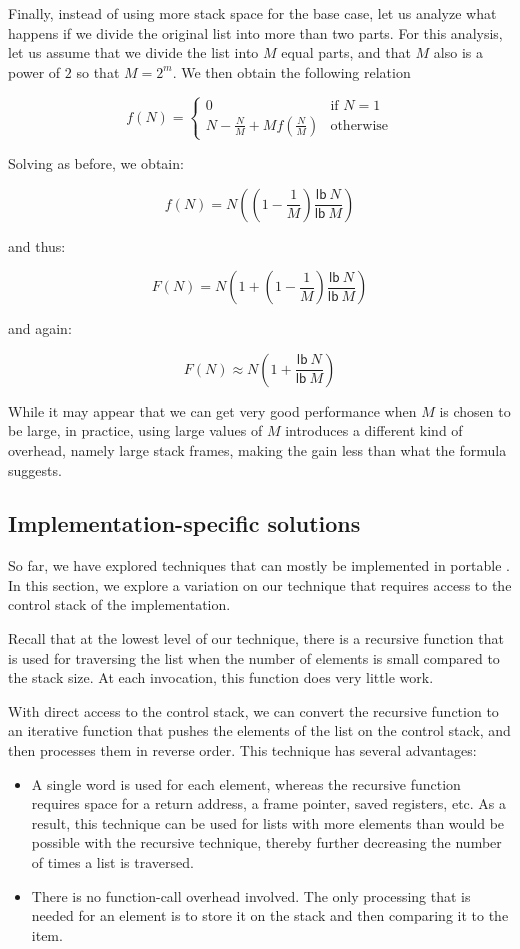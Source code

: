 Finally, instead of using more stack space for the base case, let us
analyze what happens if we divide the original list into more than two
parts.  For this analysis, let us assume that we divide the list into
$M$ equal parts, and that $M$ also is a power of $2$ so that $M =
2^m$.  We then obtain the following relation

\[ f(N) = \left\{ \begin{array}{ll}
                    0 & \mbox{if $N = 1$} \\
                    N - \frac{N}{M} + Mf(\frac{N}{M}) &\mbox{otherwise}
                  \end{array} \right. \]

Solving as before, we obtain:

\[ f(N) = N((1 - \frac{1}{M})\frac{\mathsf{lb}~N}{\mathsf{lb}~M}) \]

and thus:

\[ F(N) = N(1 + (1 - \frac{1}{M})\frac{\mathsf{lb}~N}{\mathsf{lb}~M}) \]

and again:

\[ F(N) \approx N(1 + \frac{\mathsf{lb}~N}{\mathsf{lb}~M}) \]

While it may appear that we can get very good performance when $M$ is
chosen to be large, in practice, using large values of $M$ introduces
a different kind of overhead, namely large stack frames, making the
gain less than what the formula suggests.

\subsection{Implementation-specific solutions}

So far, we have explored techniques that can mostly be implemented in
portable \commonlisp{}.  In this section, we explore a variation on
our technique that requires access to the control stack of the
implementation.

Recall that at the lowest level of our technique, there is a recursive
function that is used for traversing the list when the number of
elements is small compared to the stack size.  At each invocation,
this function does very little work.

With direct access to the control stack, we can convert the recursive
function to an iterative function that pushes the elements of the list
on the control stack, and then processes them in reverse order.  This
technique has several advantages:

\begin{itemize}
\item A single word is used for each element, whereas the recursive
  function requires space for a return address, a frame pointer,
  saved registers, etc.  As a result, this technique can be used for
  lists with more elements than would be possible with the recursive
  technique, thereby further decreasing the number of times a list is
  traversed.
\item There is no function-call overhead involved.  The only
  processing that is needed for an element is to store it on the stack
  and then comparing it to the item.
\end{itemize}

